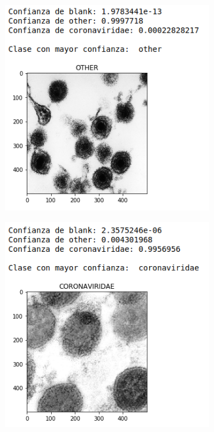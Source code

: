 \documentclass{uc3mpracticas}
\begin{document}
  \begin{figure}[!h]
    \centering
    \begin{subfigure}[b]{0.43\textwidth}
      \includegraphics[width=\textwidth, frame]{Images/ev3.png}
      \caption{}
    \end{subfigure}
    \hfill
    \begin{subfigure}[b]{0.43\textwidth}
      \includegraphics[width=\textwidth, frame]{Images/ev1.png}

\end{subfigure}
\end{figure}
\end{document}
